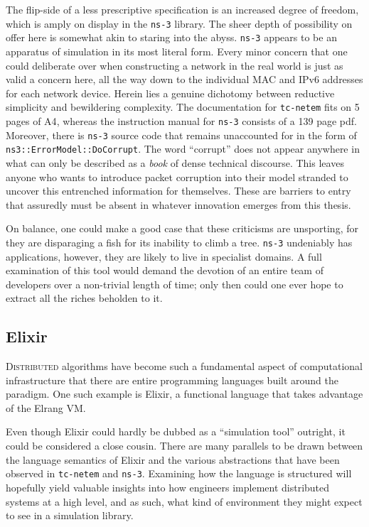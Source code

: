 The flip-side of a less prescriptive specification is an increased degree of freedom, which is amply on display in
the \texttt{ns-3} library. The sheer depth of possibility on offer here is somewhat akin to staring into the abyss.
\texttt{ns-3} appears to be an apparatus of simulation in its most literal form. Every minor concern that one could
deliberate over when constructing a network in the real world is just as valid a concern here, all the way down to
the individual MAC and IPv6 addresses for each network device. Herein lies a genuine dichotomy between reductive
simplicity and bewildering complexity. The documentation for \texttt{tc-netem} fits on 5 pages of
A4\cite{tc_netem_8_man}, whereas the instruction manual for \texttt{ns-3} consists of a 139 page pdf\cite{ns_3_man_pdf}.
Moreover, there is \texttt{ns-3} source code that remains unaccounted for in the form of
\texttt{ns3::ErrorModel::DoCorrupt}. The word ``corrupt'' does not appear anywhere in what can only be described as
a \emph{book} of dense technical discourse. This leaves anyone who wants to introduce packet corruption into their
model stranded to uncover this entrenched information for themselves. These are barriers to entry that assuredly must
be absent in whatever innovation emerges from this thesis.

On balance, one could make a good case that these criticisms are unsporting, for they are disparaging a fish for its
inability to climb a tree\cite{einstein_quotes}. \texttt{ns-3} undeniably has applications, however, they are likely
to live in specialist domains. A full examination of this tool would demand the devotion of an entire team of
developers over a non-trivial length of time; only then could one ever hope to extract all the riches beholden to it.

\subsection{Elixir}

\lettrine{D}{istributed} algorithms have become such a fundamental aspect of computational infrastructure that there
are entire programming languages built around the paradigm. One such example is Elixir, a functional language that
takes advantage of the Elrang VM\cite{elixir, erlang}.

Even though Elixir could hardly be dubbed as a ``simulation tool'' outright, it could be considered a close cousin.
There are many parallels to be drawn between the language semantics of Elixir and the various abstractions that
have been observed in \texttt{tc-netem} and \texttt{ns-3}. Examining how the language is structured will hopefully
yield valuable insights into how engineers implement distributed systems at a high level, and as such, what kind of
environment they might expect to see in a simulation library.

